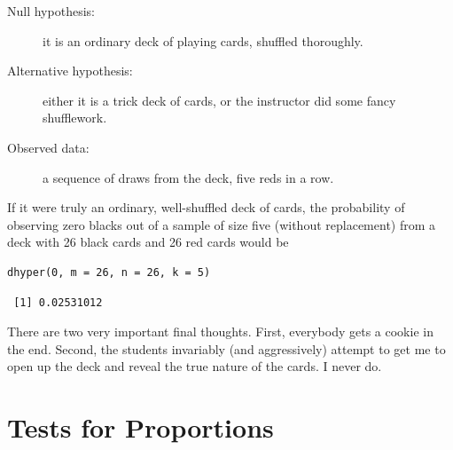 \documentclass[captions=tableheading]{scrbook}
\begin{document}
\begin{description}
\item[Null hypothesis:] it is an ordinary deck of playing cards, shuffled thoroughly.
\item[Alternative hypothesis:] either it is a trick deck of cards, or the instructor did some fancy shufflework.
\item[Observed data:] a sequence of draws from the deck, five reds in a row.
\end{description}

If it were truly an ordinary, well-shuffled deck of cards, the probability of observing zero blacks out of a sample of size five (without replacement) from a deck with 26 black cards and 26 red cards would be


\lstset{language=R}
\begin{lstlisting}
dhyper(0, m = 26, n = 26, k = 5)
\end{lstlisting}

\begin{verbatim}
 [1] 0.02531012
\end{verbatim}

There are two very important final thoughts. First, everybody gets a cookie in the end. Second, the students invariably (and aggressively) attempt to get me to open up the deck and reveal the true nature of the cards. I never do.
\section{Tests for Proportions}
\label{sec-10-2}
\label{sec-Tests-for-Proportions}
\end{document}
